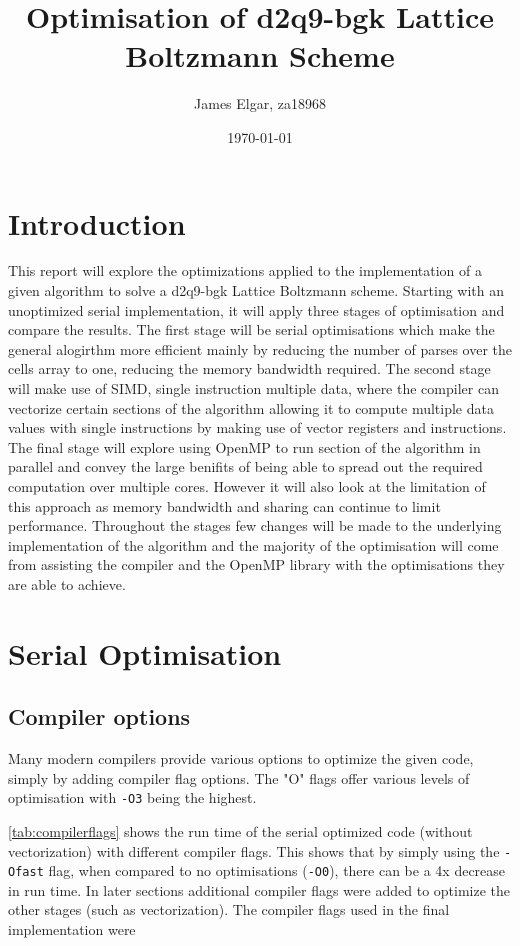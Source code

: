 \documentclass{article}
\title{Optimisation of d2q9-bgk Lattice Boltzmann Scheme}
\author{James Elgar, za18968}
\date{\today}
\begin{document}
\begin{multicols}{2}

\maketitle

\section{Introduction}

This report will explore the optimizations applied to the implementation of
a given algorithm to solve a d2q9-bgk Lattice Boltzmann scheme.  Starting with
an unoptimized serial implementation, it will apply three stages of optimisation
and compare the results. The first stage will be serial optimisations which
make the general alogirthm more efficient mainly by reducing the number of
parses over the cells array to one, reducing the memory bandwidth required. The
second stage will make use of SIMD, single instruction multiple data, where the
compiler can vectorize certain sections of the algorithm allowing it to compute
multiple data values with single instructions by making use of vector registers
and instructions. The final stage will explore using OpenMP to run section of
the algorithm in parallel and convey the large benifits of being able to spread
out the required computation over multiple cores. However it will also look at
the limitation of this approach as memory bandwidth and sharing can continue to
limit performance. Throughout the stages few changes will be made to the
underlying implementation of the algorithm and the majority of the optimisation
will come from assisting the compiler and the OpenMP library with the
optimisations they are able to achieve.

\section{Serial Optimisation}

\subsection{Compiler options}

Many modern compilers provide various options to optimize the given code,
simply by adding compiler flag options. The "O" flags offer various levels of
optimisation with \verb|-O3| being the highest.

\autoref{tab:compilerflags} shows the run time of the serial optimized code
(without vectorization) with different compiler flags. This shows that by
simply using the \verb|-Ofast| flag, when compared to no optimisations
(\verb|-O0|), there can be a 4x decrease in run time. In later sections
additional compiler flags were added to optimize the other stages (such as
vectorization). The compiler flags used in the final implementation were 


\end{multicols}
\end{document}
